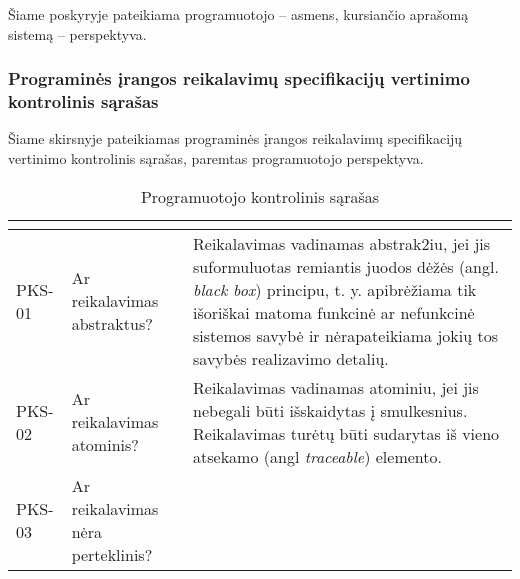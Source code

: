 \documentclass{VUMIFPSkursinis}
\begin{document}
Šiame poskyryje pateikiama programuotojo -- asmens, kursiančio aprašomą sistemą -- perspektyva.

\subsubsection{Programinės įrangos reikalavimų specifikacijų vertinimo kontrolinis sąrašas}

Šiame skirsnyje pateikiamas programinės įrangos reikalavimų specifikacijų vertinimo kontrolinis sąrašas,
paremtas programuotojo perspektyva.

\begin{center}
	\small
	\begin{longtable}{|C{2cm}|L{5cm}|L{8cm}|}
		\caption{Programuotojo kontrolinis sąrašas}
		\label{table:EmployeeSalary}
		\\ \hline
		                               &
		                   &
		\\ \hline
		PKS-01                                                                        &
		Ar reikalavimas abstraktus?                                                   &
		Reikalavimas vadinamas abstrak2iu, jei jis suformuluotas remiantis juodos dėžės (angl. \textit{black box}) principu, t. y. apibrėžiama tik išoriškai matoma funkcinė ar nefunkcinė sistemos savybė ir nėrapateikiama jokių tos savybės realizavimo detalių.                                                                                                                                                                                   \\ \hline
		PKS-02                                                                        &
		Ar reikalavimas atominis?                                                     &
		Reikalavimas vadinamas atominiu, jei jis nebegali būti išskaidytas į smulkesnius. Reikalavimas turėtų būti sudarytas iš vieno atsekamo (angl \textit{traceable}) elemento.                                                                                                                                                                                                                                                                    \\ \hline
		PKS-03                                                                        &
		Ar reikalavimas nėra perteklinis?                                             &

\end{longtable}
\end{center}
\end{document}
